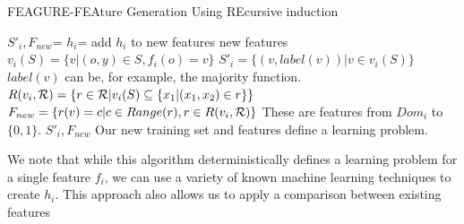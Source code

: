 \documentclass[twoside,11pt]{article}
\theoremstyle{definition}
\begin{document}
\begin{algorithm}[H]
	\caption{FEAGURE-FEAture Generation Using REcursive  induction}
	\label{code-creating-prob}
	\small
		\begin{algorithmic}
				\State $S'_i,F_{new}$=  
				\State $h_i$=  
				\State add $h_i$ to new features
				\EndIf
				\EndFor
				\State \Return new features
			\EndFunction
			\State 
                \State $v_i(S) = \{v | (o,y) \in S, f_{i}(o)=v\}$
                \State $S'_i = \{ (v, label(v)) | v \in v_i(S) \}$ 
                \Comment $label(v)$ can be, for example, the majority function.
                \State $R(v_i,{\cal R}) = \left\{ r \in {\cal R} | v_i(S) \subseteq \{x_1 | (x_1,x_2) \in r\}\right\}$
                \State $F_{new}=\{r(v)=c| c\in Range(r), r\in R(v_i,{\cal R})\}$
                \State \Comment These are features from $Dom_{i}$ to $\{0,1\}$.
                \State \Return $S'_i, F_{new}$ 
                \Comment Our new training set and features define a learning problem.
			\EndFunction
			
		\end{algorithmic}
	\end{algorithm}

We note that while this algorithm deterministically defines a learning problem for a single feature $f_i$, we can use a variety of known machine learning techniques to create $h_i$.
This approach also allows us to apply a comparison between existing features 


\end{document}
